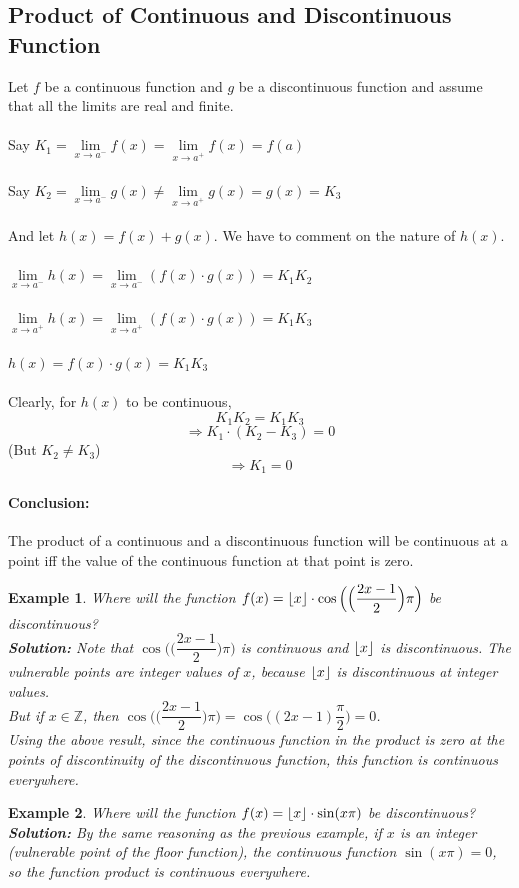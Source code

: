 \documentclass[14]{article}
\DeclarePairedDelimiter\floor{\lfloor}{\rfloor}
\newtheorem*{ex}{Example}
\theoremstyle{definition}
\begin{document}
\subsection{Product of Continuous and Discontinuous Function}
Let $f$ be a continuous function and $g$ be a discontinuous function and assume that all the limits are real and finite.\\\\
Say $K_1 = \lim\limits_{x \to a^-} f(x) = \lim\limits_{x \to a^+} f(x) = f(a)$\\\\
Say $K_2 = \lim\limits_{x \to a^-} g(x) \neq \lim\limits_{x \to a^+} g(x) = g(x) = K_3$\\\\
And let $h(x) = f(x) + g(x)$. We have to comment on the nature of $h(x)$.\\\\
$\lim\limits_{x \to a^-} h(x) = \lim\limits_{x \to a^-} (f(x) \cdot g(x)) = K_1 K_2$\\\\
$\lim\limits_{x \to a^+} h(x) = \lim\limits_{x \to a^+} (f(x) \cdot g(x)) = K_1 K_3$\\\\
$h(x) = f(x) \cdot g(x) = K_1 K_3$\\\\
Clearly, for $h(x)$ to be continuous,
\[K_1 K_2 = K_1 K_3\]
\[\Rightarrow K_1 \cdot (K_2 - K_3) = 0\]
(But $K_2 \neq K_3$)
\[\Rightarrow K_1 = 0\]
\paragraph{Conclusion:}The product of a continuous and a discontinuous function will be continuous at a point iff the value of the continuous function at that point is zero.
\begin{ex}
Where will the function $f(x) = \floor{x} \cdot \cos\Big(\Big(\dfrac{2x-1}{2}\Big) \pi\Big)$ be discontinuous?\\
\textbf{Solution:} Note that $\cos\Big(\Big(\dfrac{2x-1}{2}\Big) \pi\Big)$ is continuous and $\floor{x}$ is discontinuous.
The vulnerable points are integer values of $x$, because $\floor{x}$ is discontinuous at integer values.\\
But if $x \in \mathbb{Z}$, then $\cos\Big(\Big(\dfrac{2x-1}{2}\Big) \pi\Big) = \cos\Big((2x-1)\dfrac{\pi}{2}\Big) = 0$.\\
Using the above result, since the continuous function in the product is zero at the points of discontinuity of the discontinuous function, this function is continuous everywhere.
\end{ex}
\begin{ex}
Where will the function $f(x) = \floor{x} \cdot \sin(x \pi)$ be discontinuous?\\
\textbf{Solution:} By the same reasoning as the previous example, if $x$ is an integer (vulnerable point of the floor function), the continuous function $\sin(x\pi) = 0$, so the function product is continuous everywhere.
\end{ex}
\end{document}
